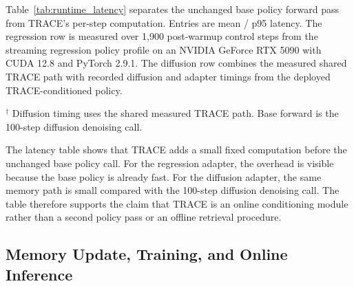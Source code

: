 \documentclass{article}
\begin{document}
Table~\ref{tab:runtime_latency} separates the unchanged base policy forward pass from TRACE's per-step computation. Entries are mean / p95 latency. The regression row is measured over 1,900 post-warmup control steps from the streaming regression policy profile on an NVIDIA GeForce RTX 5090 with CUDA 12.8 and PyTorch 2.9.1. The diffusion row combines the measured shared TRACE path with recorded diffusion and adapter timings from the deployed TRACE-conditioned policy.

\begin{table}[H]
    \centering
    \caption{Per-step deployment latency breakdown in milliseconds.}
    \label{tab:runtime_latency}
    \setlength{\tabcolsep}{3.5pt}
    \renewcommand{\arraystretch}{1.05}
    \vspace{2pt}
    \footnotesize{$^\dagger$ Diffusion timing uses the shared measured TRACE path. Base forward is the 100-step diffusion denoising call.}
\end{table}

The latency table shows that TRACE adds a small fixed computation before the unchanged base policy call. For the regression adapter, the overhead is visible because the base policy is already fast. For the diffusion adapter, the same memory path is small compared with the 100-step diffusion denoising call. The table therefore supports the claim that TRACE is an online conditioning module rather than a second policy pass or an offline retrieval procedure.

\subsection{Memory Update, Training, and Online Inference}
\label{app:memory_update_losses}
\label{app:adapter_update}
\end{document}

